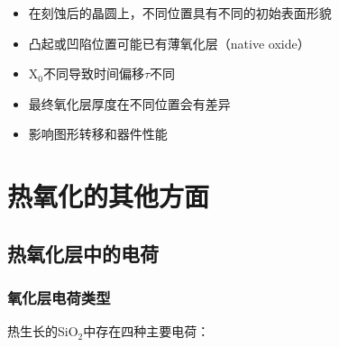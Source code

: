 \documentclass[UTF8,12pt,a4paper]{ctexart}
\begin{document}
\begin{itemize}
    \item 在刻蚀后的晶圆上，不同位置具有不同的初始表面形貌
    \item 凸起或凹陷位置可能已有薄氧化层（native oxide）
    \item X$_0$不同导致时间偏移$\tau$不同
    \item 最终氧化层厚度在不同位置会有差异
    \item 影响图形转移和器件性能
\end{itemize}
\newpage
\section{热氧化的其他方面}

\subsection{热氧化层中的电荷}

\subsubsection{氧化层电荷类型}

热生长的SiO$_2$中存在四种主要电荷：
\end{document}
